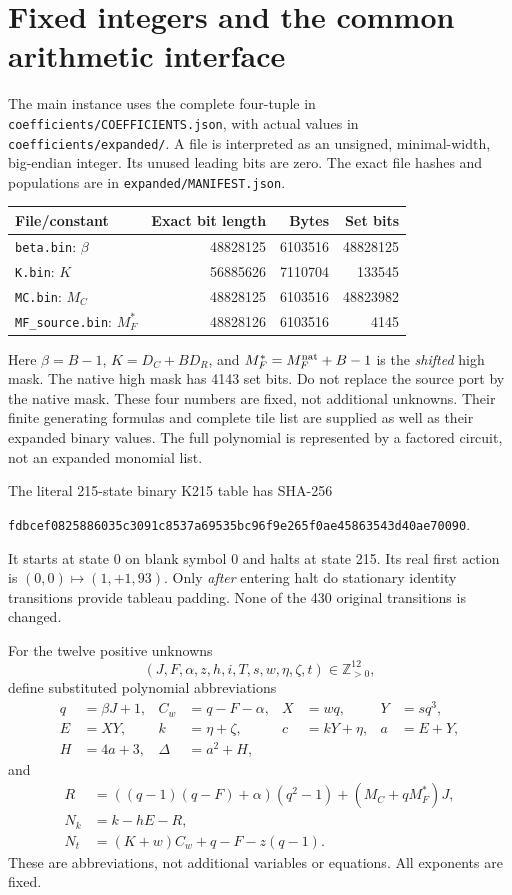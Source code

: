 \documentclass[11 pt]{article}
\newcommand{\Pos}{\mathbb Z_{>0}}
\begin{document}
\section{Fixed integers and the common arithmetic interface}
The main instance uses the complete four-tuple in
\texttt{coefficients/COEFFICIENTS.json}, with actual values in
\texttt{coefficients/expanded/}. A file is interpreted as an unsigned, minimal-width, big-endian integer. Its unused leading bits are zero. The exact file hashes and populations are in \texttt{expanded/MANIFEST.json}.
\begin{center}\small
\begin{tabular}{lrrr}
\toprule
File/constant&Exact bit length&Bytes&Set bits\\
\midrule
\texttt{beta.bin}: $\beta $&48828125&6103516&48828125\\
\texttt{K.bin}: $ K $&56885626&7110704&133545\\
\texttt{MC.bin}: $ M_C $&48828125&6103516&48823982\\
\texttt{MF\_source.bin}: $ M_F^*$&48828126&6103516&4145\\
\bottomrule
\end{tabular}
\end{center}
Here $\beta=B-1 $, $ K=D_C+BD_R $, and $ M_F^*=M_F^{\rm nat}+B-1 $ is the \emph{shifted} high mask. The native high mask has 4143 set bits. Do not replace the source port by the native mask. These four numbers are fixed, not additional unknowns. Their finite generating formulas and complete tile list are supplied as well as their expanded binary values. The full polynomial is represented by a factored circuit, not an expanded monomial list.

The literal 215-state binary K215 table has SHA-256
\begin{center}\small
\texttt{fdbcef0825886035c3091c8537a69535bc96f9e265f0ae45863543d40ae70090}.
\end{center}
It starts at state 0 on blank symbol 0 and halts at state 215. Its real first action is $(0,0)\mapsto(1,+1,93)$. Only \emph{after} entering halt do stationary identity transitions provide tableau padding. None of the 430 original transitions is changed.

For the twelve positive unknowns
\[
(J,F,\alpha,z,h,i,T,s,w,\eta,\zeta,t)\in\Pos^{12},
\]
define substituted polynomial abbreviations
\begin{align*}
q&=\beta J+1,&C_w&=q-F-\alpha,&X&=wq,&Y&=sq^3,\\
E&=XY,&k&=\eta+\zeta,&c&=kY+\eta,&a&=E+Y,\\
H&=4 a+3,&\Delta&=a^2+H,&&&
\end{align*}
and
\begin{align*}
R&=((q-1)(q-F)+\alpha)(q^2-1)+(M_C+qM_F^*)J,\\
N_k&=k-hE-R,\\
N_t&=(K+w)C_w+q-F-z(q-1).
\end{align*}
These are abbreviations, not additional variables or equations. All exponents are fixed.
\end{document}
